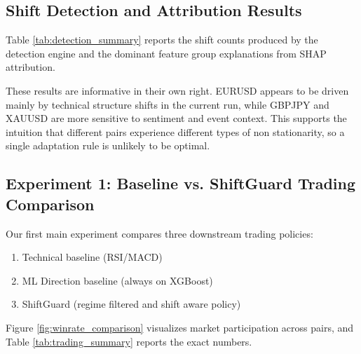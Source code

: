 \documentclass[11pt]{article}
\begin{document}
\subsection{Shift Detection and Attribution Results}
Table \ref{tab:detection_summary} reports the shift counts produced by the detection engine and the dominant feature group explanations from SHAP attribution.

\begin{table}[H]
\centering
\caption{Detected shifts and dominant attribution patterns.}
\label{tab:detection_summary}
\end{table}

These results are informative in their own right. EURUSD appears to be driven mainly by technical structure shifts in the current run, while GBPJPY and XAUUSD are more sensitive to sentiment and event context. This supports the intuition that different pairs experience different types of non stationarity, so a single adaptation rule is unlikely to be optimal.

\subsection{Experiment 1: Baseline vs. ShiftGuard Trading Comparison}
Our first main experiment compares three downstream trading policies:
\begin{enumerate}
    \item Technical baseline (RSI/MACD)
    \item ML Direction baseline (always on XGBoost)
    \item ShiftGuard (regime filtered and shift aware policy)
\end{enumerate}

Figure \ref{fig:winrate_comparison} visualizes market participation across pairs, and Table \ref{tab:trading_summary} reports the exact numbers.
\end{document}

